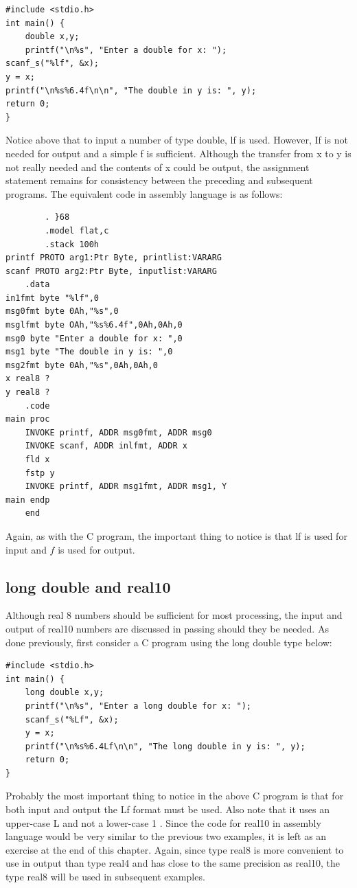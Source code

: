 \documentclass[10pt]{book}
\begin{document}
\begin{verbatim}
#include <stdio.h>
int main() {
    double x,y;
    printf("\n%s", "Enter a double for x: ");
scanf_s("%lf", &x);
y = x;
printf("\n%s%6.4f\n\n", "The double in y is: ", y);
return 0;
}
\end{verbatim}

Notice above that to input a number of type double, lf is used. However, If is not needed for output and a simple f is sufficient. Although the transfer from x to y is not really needed and the contents of x could be output, the assignment statement remains for consistency between the preceding and subsequent programs. The equivalent code in assembly language is as follows:


\begin{verbatim}
        . }68
        .model flat,c
        .stack 100h
printf PROTO arg1:Ptr Byte, printlist:VARARG
scanf PROTO arg2:Ptr Byte, inputlist:VARARG
    .data
in1fmt byte "%lf",0
msg0fmt byte 0Ah,"%s",0
msglfmt byte OAh,"%s%6.4f",0Ah,0Ah,0
msg0 byte "Enter a double for x: ",0
msg1 byte "The double in y is: ",0
msg2fmt byte 0Ah,"%s",0Ah,0Ah,0
x real8 ?
y real8 ?
    .code
main proc
    INVOKE printf, ADDR msg0fmt, ADDR msg0
    INVOKE scanf, ADDR inlfmt, ADDR x
    fld x
    fstp y
    INVOKE printf, ADDR msg1fmt, ADDR msg1, Y
main endp
    end
\end{verbatim}

Again, as with the C program, the important thing to notice is that lf is used for input and $f$ is used for output.

\subsection{long double and real10}
Although real 8 numbers should be sufficient for most processing, the input and output of real10 numbers are discussed in passing should they be needed. As done previously, first consider a C program using the long double type below:

\begin{verbatim}
#include <stdio.h>
int main() {
    long double x,y;
    printf("\n%s", "Enter a long double for x: ");
    scanf_s("%Lf", &x);
    y = x;
    printf("\n%s%6.4Lf\n\n", "The long double in y is: ", y);
    return 0;
}
\end{verbatim}

Probably the most important thing to notice in the above C program is that for both input and output the Lf format must be used. Also note that it uses an upper-case L and not a lower-case 1 . Since the code for real10 in assembly language would be very similar to the previous two examples, it is left as an exercise at the end of this chapter. Again, since type real8 is more convenient to use in output than type real4 and has close to the same precision as real10, the type real8 will be used in subsequent examples.
\end{document}
